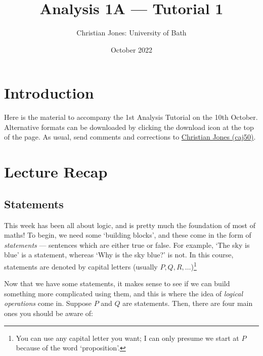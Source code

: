 \documentclass[
  10pt,
  a4paper]{article}
\title{Analysis 1A --- Tutorial 1}
\author{Christian Jones: University of Bath}
\date{October 2022}
\theoremstyle{plain}
\theoremstyle{definition}
\theoremstyle{plain}
\theoremstyle{plain}
\theoremstyle{plain}
\theoremstyle{plain}
\theoremstyle{definition}
\theoremstyle{definition}
\newtheorem*{Order Axioms*}{Order Axioms}\newtheorem{Order Axioms}{Order Axioms}[section]
\theoremstyle{remark}
\theoremstyle{remark}
\begin{document}
\maketitle

{
\setcounter{tocdepth}{2}
\tableofcontents
}
\newpage
{}

\hypertarget{introduction}{%
\section*{Introduction}\label{introduction}}

Here is the material to accompany the 1st Analysis Tutorial on the 10th October. Alternative formats can be downloaded by clicking the download icon at the top of the page. As usual, send comments and corrections to \href{mailto:caj50@bath.ac.uk}{Christian Jones (caj50)}.

\hypertarget{lecture-recap}{%
\section{Lecture Recap}\label{lecture-recap}}

\hypertarget{statements}{%
\subsection{Statements}\label{statements}}

This week has been all about logic, and is pretty much the foundation of most of maths! To begin, we need some `building blocks', and these come in the form of \emph{statements} --- sentences which are either true or false. For example, \color{blue} `The sky is blue' \color{black} is a statement, whereas \color{red} `Why is the sky blue?' \color{black} is not. In this course, statements are denoted by capital letters (usually \(P,Q,R,\ldots\))\footnote{You can use any capital letter you want; I can only presume we start at \(P\) because of the word `proposition'.}

Now that we have some statements, it makes sense to see if we can build something more complicated using them, and this is where the idea of \emph{logical operations} come in. Suppose \(P\) and \(Q\) are statements. Then, there are four main ones you should be aware of:
\end{document}
